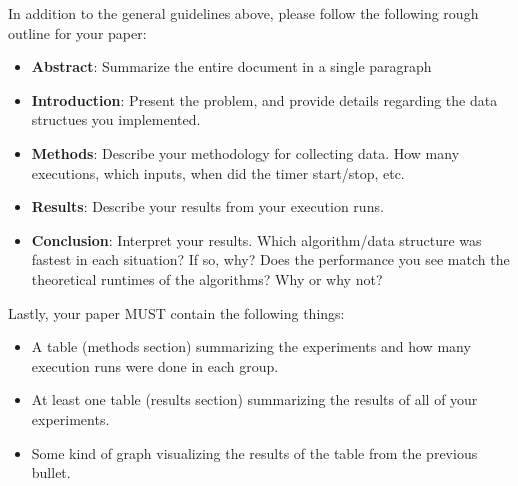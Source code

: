 \documentclass[paper=a4, fontsize=11pt, parskip=full]{scrartcl} %
\numberwithin{equation}{section} %
\numberwithin{figure}{section} %
\numberwithin{table}{section} %
\begin{document}
In addition to the general guidelines above, please follow the following rough outline for your paper:

\begin{itemize}
	\item \textbf{Abstract}: Summarize the entire document in a single paragraph
	\item \textbf{Introduction}: Present the problem, and provide details regarding the data structues you implemented.
	\item \textbf{Methods}: Describe your methodology for collecting data. How many executions, which inputs, when did the timer start/stop, etc.
	\item \textbf{Results}: Describe your results from your execution runs.
	\item \textbf{Conclusion}: Interpret your results. Which algorithm/data structure was fastest in each situation? If so, why? Does the performance you see match the theoretical runtimes of the algorithms? Why or why not?
\end{itemize}

Lastly, your paper MUST contain the following things:

\begin{itemize}
	\item A table (methods section) summarizing the experiments and how many execution runs were done in each group.
	\item At least one table (results section) summarizing the results of all of your experiments.
	\item Some kind of graph visualizing the results of the table from the previous bullet.
\end{itemize}


\end{document}

